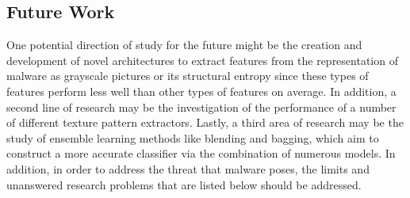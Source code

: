 \documentclass[pdflatex,sn-mathphys]{sn-jnl}%
\begin{document}
\subsection{Future Work}

\color{blue}
One potential direction of study for the future might be the creation and development of novel architectures to extract features from the representation of malware as grayscale pictures or its structural entropy since these types of features perform less well than other types of features on average. In addition, a second line of research may be the investigation of the performance of a number of different texture pattern extractors. Lastly, a third area of research may be the study of ensemble learning methods like blending and bagging, which aim to construct a more accurate classifier via the combination of numerous models. In addition, in order to address the threat that malware poses, the limits and unanswered research problems that are listed below should be addressed.
\color{black}



\end{document}
